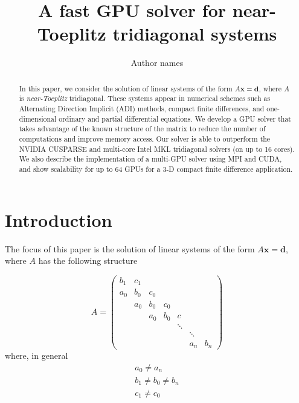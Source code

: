 \documentclass{elsarticle}
\begin{document}
\begin{frontmatter}
\author{Author names}
\title{A fast GPU solver for near-Toeplitz tridiagonal systems}
\maketitle

\begin{abstract}
In this paper, we consider the solution of linear
systems of the form $A\bm{x} = \bm{d}$,
where $A$ is \emph{near-Toeplitz} tridiagonal.
These systems appear in numerical schemes
such as
Alternating Direction Implicit (ADI) methods,
compact finite differences,
and one-dimensional ordinary
and partial differential equations.
We develop a GPU solver that takes advantage
of the known structure of the matrix
to reduce the number of computations
and improve memory access.
Our solver is able to outperform
the NVIDIA CUSPARSE and
multi-core Intel MKL tridiagonal solvers
(on up to 16 cores).
We also describe the implementation of a multi-GPU solver
using MPI and CUDA,
and show scalability for up to 64 GPUs
for a 3-D compact finite difference application.
\end{abstract}

\end{frontmatter}
    
\section{Introduction}

The focus of this paper is the solution of
linear systems of the form $A\bm{x} = \bm{d}$,
where $A$ has the following structure

\begin{equation} \label{eqn:toeplitz-matrix}
A = 
\begin{pmatrix}
     b_1 & c_1  \\
     a_0 & b_0  &  c_0  \\
         & a_0  &  b_0 &  c_0  \\
         &      &  a_0 &  b_0 &  c    \\
         &      &      &      &  \ddots \\
         &      &      &      &     &  \ddots  \\
         &      &      &      &     &  a_n  &  b_n
\end{pmatrix}
\end{equation}
%
where, in general
\begin{align*}
    & a_0 \neq a_n & \\
    & b_1 \neq b_0 \neq b_n &\\
    & c_1 \neq c_0 &
\end{align*}
\end{document}
